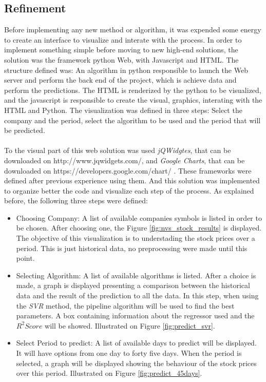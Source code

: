 \subsection{Refinement}
Before implementing any new method or algorithm, it was expended some energy to create an interface to visualize and interate with the process. In order to implement something simple
before moving to new high-end solutions, the solution was the framework python Web, with Javascript and HTML. The structure defined was: An algorithm in python responsible to launch the
Web server and perform the back end of the project, which is achieve data and perform the predictions. The HTML is renderized by the python to be visualized, and the javascript is responsible
to create the visual, graphics, interating with the HTML and Python. The visualization was defined in three steps: Select the company and the period, select the algorithm to be used and the period
that will be predicted.\\
\\
To the visual part of this web solution was used \textit{jQWidgtes}, that can be downloaded on http://www.jqwidgets.com/, and \textit{Google Charts}, that can be downloaded on https://developers.google.com/chart/ .
These frameworks were defined after previous experience using them. And this solution was implemented to organize better the code and visualize each step of the process. As explained before, the
following three steps were defined:
\begin{itemize}
 \item Choosing Company: A list of available companies symbols is listed in order to be chosen. After choosing one, the Figure \ref{fig:nvs_stock_results} is displayed. The objective of this
 visualization is to understading the stock prices over a period. This is just historical data, no preprocessing were made until this point. 
 \item Selecting Algorithm: A list of available algorithms is listed. After a choice is made, a graph is displayed presenting a comparison between the historical data and the result of the 
 prediction to all the data. In this step, when using the \textit{SVR} method, the pipeline algorithm will be used to find the best parameters. A box containing information about the regressor
 used and the $R^2 Score$ will be showed. Illustrated on Figure \ref{fig:predict_svr}.
 \item Select Period to predict: A list of available days to predict will be displayed. It will have options from one day to forty five days. When the period is selected, a graph will be displayed
 showing the behaviour of the stock prices over this period. Illustrated on Figure \ref{fig:predict_45days}.
\end{itemize}